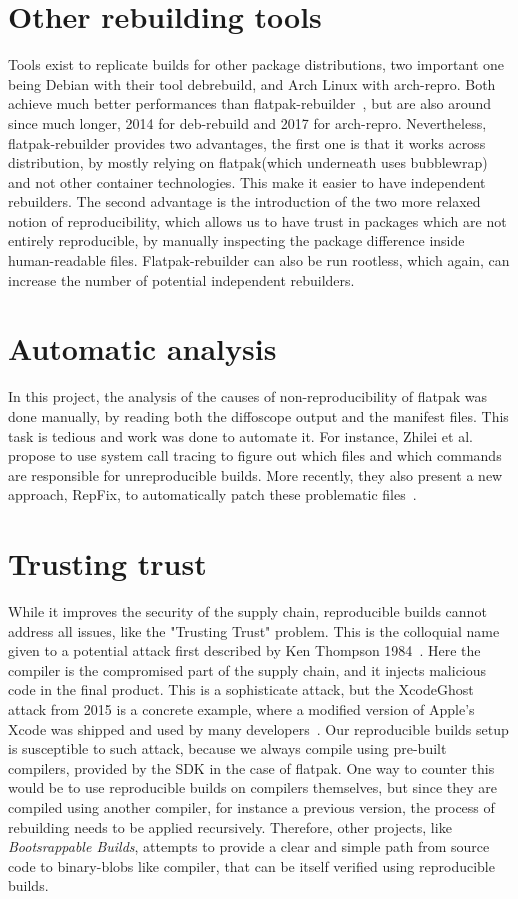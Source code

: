 \documentclass[a4paper,11pt,oneside]{report}
\theoremstyle{definition}
\newcommand{\sysname}{flatpak-rebuilder\xspace}
\newcommand{\Sysname}{Flatpak-rebuilder\xspace}
\newcommand{\rb}{reproducible builds\xspace}
\newcommand{\fp}{flatpak\xspace}
\begin{document}
\section{Other rebuilding tools}
Tools exist to replicate builds for other package distributions, two important
one being Debian with their tool debrebuild, and Arch Linux with arch-repro.
Both achieve much better performances than \sysname~\cite{debian:repro,
arch-rebuilderd}, but are also around since much longer, 2014 for deb-rebuild
and 2017 for arch-repro. Nevertheless, \sysname provides two advantages, the
first one is that it works across distribution, by mostly relying on \fp (which
underneath uses bubblewrap) and not other container technologies. This make it
easier to have independent rebuilders. The second advantage is the introduction
of the two more relaxed notion of reproducibility, which allows us to have
trust in packages which are not entirely reproducible, by manually inspecting
the package difference inside human-readable files. \Sysname can also be run
rootless, which again, can increase the number of potential independent
rebuilders.

\section{Automatic analysis}
In this project, the analysis of the causes of non-reproducibility of \fp was
done manually, by reading both the diffoscope output and the manifest files.
This task is tedious and work was done to automate it. For instance, Zhilei et
al.~\cite{DBLP:journals/corr/abs-1803-06766} propose to use system call tracing
to figure out which files and which commands are responsible for unreproducible
builds. More recently, they also present a new approach, RepFix, to
automatically patch these problematic files~\cite{}.

\section{Trusting trust}
While it improves the security of the supply chain, \rb cannot address all
issues, like the "Trusting Trust" problem. This is the colloquial name given to
a potential attack first described by Ken Thompson 1984~\cite{thompson1984}.
Here the compiler is the compromised part of the supply chain, and it injects
malicious code in the final product. This is a sophisticate attack, but the
XcodeGhost attack from 2015 is a concrete example, where a modified version of
Apple's Xcode was shipped and used by many developers~\cite{enwiki:1054394297}.
Our \rb setup is susceptible to such attack, because we always compile using
pre-built compilers, provided by the SDK in the case of \fp. One way to counter
this would be to use \rb on compilers themselves, but since they are compiled
using another compiler, for instance a previous version, the process of
rebuilding needs to be applied recursively. Therefore, other projects, like
\emph{Bootsrappable Builds}, attempts to provide a clear and simple path from
source code to binary-blobs like compiler, that can be itself verified using
\rb.
\end{document}
